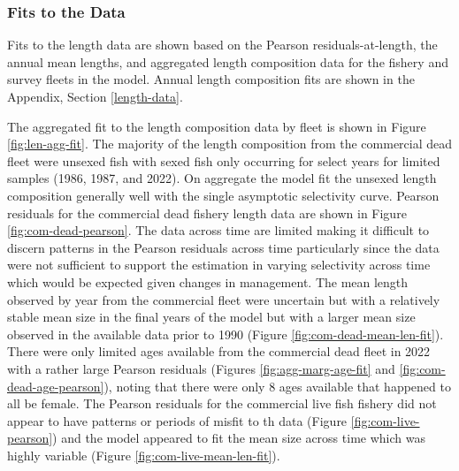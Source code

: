 \documentclass[11pt,
  english,
  letterpaper,
]{article}
\begin{document}
\hypertarget{fits-to-the-data}{%
\subsubsection{Fits to the Data}\label{fits-to-the-data}}

Fits to the length data are shown based on the Pearson residuals-at-length, the annual mean lengths, and aggregated length composition data for the fishery and survey fleets in the model. Annual length composition fits are shown in the Appendix, Section \ref{length-data}.

The aggregated fit to the length composition data by fleet is shown in Figure \ref{fig:len-agg-fit}. The majority of the length composition from the commercial dead fleet were unsexed fish with sexed fish only occurring for select years for limited samples (1986, 1987, and 2022). On aggregate the model fit the unsexed length composition generally well with the single asymptotic selectivity curve. Pearson residuals for the commercial dead fishery length data are shown in Figure \ref{fig:com-dead-pearson}. The data across time are limited making it difficult to discern patterns in the Pearson residuals across time particularly since the data were not sufficient to support the estimation in varying selectivity across time which would be expected given changes in management. The mean length observed by year from the commercial fleet were uncertain but with a relatively stable mean size in the final years of the model but with a larger mean size observed in the available data prior to 1990 (Figure \ref{fig:com-dead-mean-len-fit}). There were only limited ages available from the commercial dead fleet in 2022 with a rather large Pearson residuals (Figures \ref{fig:agg-marg-age-fit} and \ref{fig:com-dead-age-pearson}), noting that there were only 8 ages available that happened to all be female. The Pearson residuals for the commercial live fish fishery did not appear to have patterns or periods of misfit to th data (Figure \ref{fig:com-live-pearson}) and the model appeared to fit the mean size across time which was highly variable (Figure \ref{fig:com-live-mean-len-fit}).
\end{document}
